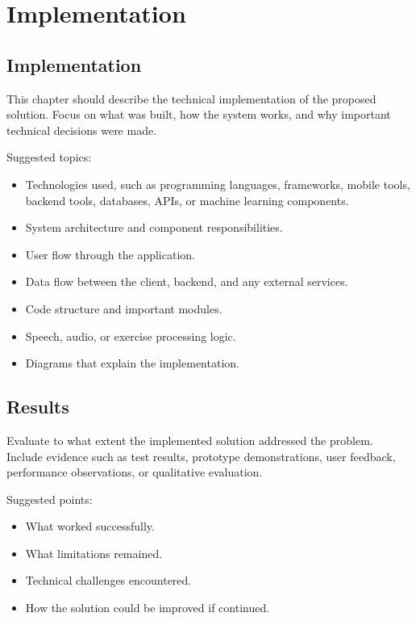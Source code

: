 \chapter{Implementation}
\label{ch:implementation}

\section{Implementation}
\label{sec:implementation}

This chapter should describe the technical implementation of the proposed solution. Focus on what was built, how the system works, and why important technical decisions were made.

Suggested topics:
\begin{itemize}[noitemsep]
  \item Technologies used, such as programming languages, frameworks, mobile tools, backend tools, databases, APIs, or machine learning components.
  \item System architecture and component responsibilities.
  \item User flow through the application.
  \item Data flow between the client, backend, and any external services.
  \item Code structure and important modules.
  \item Speech, audio, or exercise processing logic.
  \item Diagrams that explain the implementation.
\end{itemize}

\section{Results}
\label{sec:results}

Evaluate to what extent the implemented solution addressed the problem. Include evidence such as test results, prototype demonstrations, user feedback, performance observations, or qualitative evaluation.

Suggested points:
\begin{itemize}[noitemsep]
  \item What worked successfully.
  \item What limitations remained.
  \item Technical challenges encountered.
  \item How the solution could be improved if continued.
\end{itemize}
